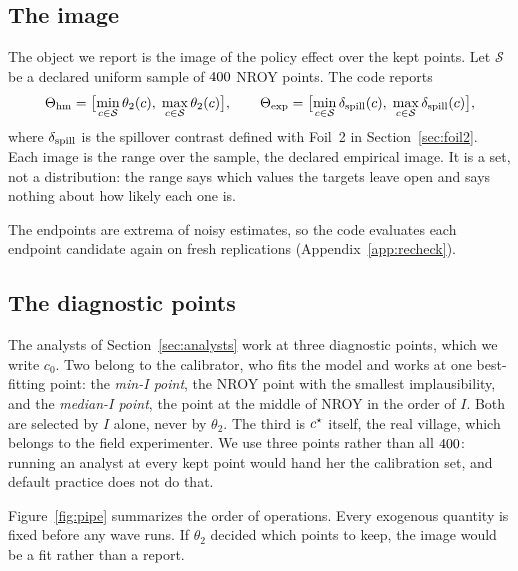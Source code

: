 \subsection{The image}

The object we report is the image of the policy effect over the kept points.
Let $\mathcal S$ be a declared uniform sample of $400$ NROY points. The
code reports
\begin{equation}\label{eq:image}
  \Theta_{\mathrm{hm}}=\bigl[\min_{c\in\mathcal S}\theta_2(c),\;\max_{c\in\mathcal S}\theta_2(c)\bigr],
  \qquad
  \Theta_{\mathrm{exp}}=\bigl[\min_{c\in\mathcal S}\delta_{\mathrm{spill}}(c),\;\max_{c\in\mathcal S}\delta_{\mathrm{spill}}(c)\bigr],
\end{equation}
where $\delta_{\mathrm{spill}}$ is the spillover contrast defined with Foil~2 in
Section~\ref{sec:foil2}. Each image is the range over the sample, the declared
empirical image. It is a set, not a distribution: the range says which values the
targets leave open and says nothing about how likely each one is.

The endpoints are extrema of noisy estimates, so the code evaluates each endpoint
candidate again on fresh replications (Appendix~\ref{app:recheck}).

\subsection{The diagnostic points}

The analysts of Section~\ref{sec:analysts} work at three diagnostic points, which
we write $c_0$. Two belong to the calibrator, who fits the model and works at one
best-fitting point: the \emph{min-I point}, the NROY point with the smallest
implausibility, and the \emph{median-I point}, the point at the middle of NROY in
the order of $I$. Both are selected by $I$ alone, never by $\theta_2$. The third
is $c^\star$ itself, the real village, which belongs to the field experimenter.
We use three points rather than all $400$: running an analyst at every
kept point would hand her the calibration set, and default practice does not do
that.

Figure~\ref{fig:pipe} summarizes the order of operations. Every exogenous
quantity is fixed before any wave runs. If $\theta_2$ decided which points to
keep, the image would be a fit rather than a report.

